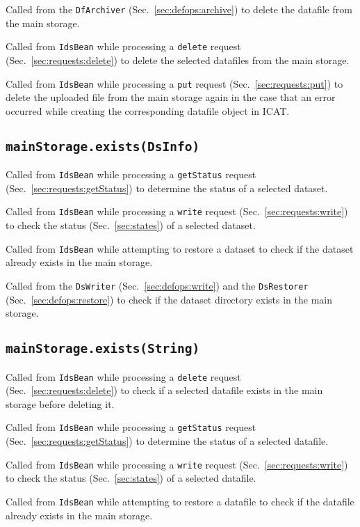 \documentclass[paper=a4]{scrartcl}
\begin{document}
Called from the \texttt{DfArchiver} (Sec.~\ref{sec:defops:archive})
to delete the datafile from the main storage.

Called from \texttt{IdsBean} while processing a \texttt{delete}
request (Sec.~\ref{sec:requests:delete}) to delete the selected
datafiles from the main storage.

Called from \texttt{IdsBean} while processing a \texttt{put} request
(Sec.~\ref{sec:requests:put}) to delete the uploaded file from the
main storage again in the case that an error occurred while creating
the corresponding datafile object in ICAT.

\subsection{\texttt{mainStorage.exists(DsInfo)}}

Called from \texttt{IdsBean} while processing a \texttt{getStatus}
request (Sec.~\ref{sec:requests:getStatus}) to determine the status of
a selected dataset.

Called from \texttt{IdsBean} while processing a \texttt{write}
request (Sec.~\ref{sec:requests:write}) to check the status
(Sec.~\ref{sec:states}) of a selected dataset.

Called from \texttt{IdsBean} while attempting to restore a dataset to
check if the dataset already exists in the main storage.

Called from the \texttt{DsWriter} (Sec.~\ref{sec:defops:write}) and
the \texttt{DsRestorer} (Sec.~\ref{sec:defops:restore}) to check if
the dataset directory exists in the main storage.

\subsection{\texttt{mainStorage.exists(String)}}

Called from \texttt{IdsBean} while processing a \texttt{delete}
request (Sec.~\ref{sec:requests:delete}) to check if a selected
datafile exists in the main storage before deleting it.

Called from \texttt{IdsBean} while processing a \texttt{getStatus}
request (Sec.~\ref{sec:requests:getStatus}) to determine the status of
a selected datafile.

Called from \texttt{IdsBean} while processing a \texttt{write}
request (Sec.~\ref{sec:requests:write}) to check the status
(Sec.~\ref{sec:states}) of a selected datafile.

Called from \texttt{IdsBean} while attempting to restore a datafile to
check if the datafile already exists in the main storage.
\end{document}
